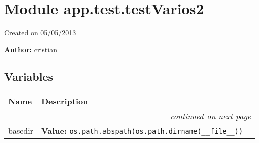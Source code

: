 %
%
%


\section{Module app.test.testVarios2}

    \label{app:test:testVarios2}
Created on 05/05/2013

\textbf{Author:} cristian





  \subsection{Variables}

    \vspace{-1cm}
\hspace{\varindent}\begin{longtable}{|p{\varnamewidth}|p{\vardescrwidth}|l}
\cline{1-2}
\cline{1-2} \centering \textbf{Name} & \centering \textbf{Description}& \\
\cline{1-2}
\endhead\cline{1-2}\multicolumn{3}{r}{\small\textit{continued on next page}}\\\endfoot\cline{1-2}
\endlastfoot\raggedright b\-a\-s\-e\-d\-i\-r\- & \raggedright \textbf{Value:} 
{\tt os.path.abspath(os.path.dirname(\_\_file\_\_))}&\\
\cline{1-2}
\end{longtable}



